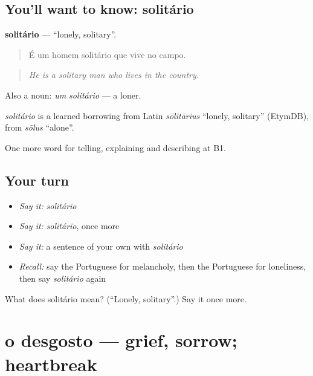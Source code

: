\subsection*{You'll want to know: solitário}
\textbf{solitário} — \textquotedblleft{}lonely, solitary\textquotedblright{}.

\begin{quote}
É um homem solitário que vive no campo.
\end{quote}

\begin{quote}
\emph{He is a solitary man who lives in the country.}
\end{quote}

Also a noun: \emph{um solitário} — a loner.

\begin{cousinweb}
\emph{solitário} is a learned borrowing from Latin \emph{sōlitārius} \textquotedblleft{}lonely, solitary\textquotedblright{} (EtymDB), from \emph{sōlus} \textquotedblleft{}alone\textquotedblright{}.
\end{cousinweb}

\begin{grammarlens}[title={What you've built}]
One more word for telling, explaining and describing at B1.
\end{grammarlens}

\subsection*{Your turn}
\begin{itemize}
\raggedright
  \item \emph{Say it:} \emph{solitário}
  \item \emph{Say it:} \emph{solitário}, once more
  \item \emph{Say it:} a sentence of your own with \emph{solitário}
  \item \emph{Recall:} say the Portuguese for melancholy, then the Portuguese for loneliness, then say \emph{solitário} again
\end{itemize}

\begin{tcolorbox}[breakable,colback=teal!4,colframe=teal!35!black,title={Before you move on}]
What does solitário mean? (\textquotedblleft{}Lonely, solitary\textquotedblright{}.) Say it once more.
\end{tcolorbox}
\section[o desgosto]{o desgosto — grief, sorrow; heartbreak}

